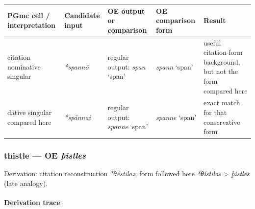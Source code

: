 \documentclass[
  british,
  a4paper,
]{article}
\newcounter{none} %
\begin{document}
{\def\LTcaptype{none} %
\begin{longtable}[]{@{}
  >{\raggedright\arraybackslash}p{}
  >{\raggedright\arraybackslash}p{}
  >{\raggedright\arraybackslash}p{}
  >{\raggedright\arraybackslash}p{}
  >{\raggedright\arraybackslash}p{}@{}}
\toprule\noalign{}
\begin{minipage}[b]{\linewidth}\raggedright
PGmc cell / interpretation
\end{minipage} & \begin{minipage}[b]{\linewidth}\raggedright
Candidate input
\end{minipage} & \begin{minipage}[b]{\linewidth}\raggedright
OE output or comparison
\end{minipage} & \begin{minipage}[b]{\linewidth}\raggedright
OE comparison form
\end{minipage} & \begin{minipage}[b]{\linewidth}\raggedright
Result
\end{minipage} \\
\midrule\noalign{}
\endhead
\bottomrule\noalign{}
\endlastfoot
citation nominative singular & {\emph{*spannō}} & regular output:
{\emph{span}} `span' & {\emph{spann}} `span' & useful citation-form
background, but not the form compared here \\
dative singular compared here & {\emph{*spánnai}} & regular output:
{\emph{spanne}} `span' & {\emph{spanne}} `span' & exact match for that
conservative form \\
\end{longtable}
}

\subsubsection{\texorpdfstring{thistle --- OE
\emph{þistles}}{thistle --- OE þistles}}\label{thistle-oe-uxfeistles}

Derivation: citation reconstruction \emph{*θéstilaz}; form followed here
\emph{*θístilas} \textgreater{} \emph{þistles} (late analogy).

\paragraph{Derivation trace}\label{derivation-trace-139}
\end{document}
